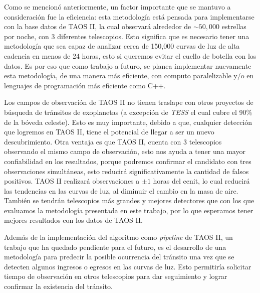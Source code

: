 Como se mencionó anteriormente, un factor importante que se mantuvo a consideración fue la eficiencia: esta metodología está pensada para implementarse con la base datos de TAOS II, la cual observará alrededor de $\sim 50,000$ estrellas por noche, con 3 diferentes telescopios. Esto significa que es necesario tener una metodología que sea capaz de analizar cerca de 150,000 curvas de luz de alta cadencia en menos de 24 horas, esto si queremos evitar el cuello de botella con los datos. Es por eso que como trabajo a futuro, se planea implementar nuevamente esta metodología, de una manera más eficiente, con computo paralelizable y/o en lenguajes de programación más eficiente como C++.

Los campos de observación de TAOS II no tienen traslape con otros proyectos de búsqueda de tránsitos de exoplanetas (a excepción de \textit{TESS} el cual cubre el 90\% de la bóveda celeste). Esto es muy importante, debido a que, cualquier detección que logremos en TAOS II, tiene el potencial de llegar a ser un nuevo descubrimiento. Otra ventaja es que TAOS II, cuenta con 3 telescopios observando el mismo campo de observación, esto nos ayuda a tener una mayor confiabilidad en los resultados, porque podremos confirmar el candidato con tres observaciones simultáneas, esto reducirá significativamente la cantidad de falsos positivos. TAOS II realizará observaciones a $\pm 1$ horas del cenit, lo cual reducirá las tendencias en las curvas de luz, al diminuir el cambio en la masa de aire. También se tendrán telescopios más grandes y mejores detectores que con los que evaluamos la metodología presentada en este trabajo, por lo que esperamos tener mejores resultados con los datos de TAOS II.

Además de la implementación del algoritmo como \textit{pipeline} de TAOS II, un trabajo que ha quedado pendiente para el futuro, es el desarrollo de una metodología para predecir la posible ocurrencia del tránsito una vez que se detecten algunos ingresos o egresos en las curvas de luz. Esto permitiría solicitar tiempo de observación en otros telescopios para dar seguimiento y lograr confirmar la existencia del tránsito.



